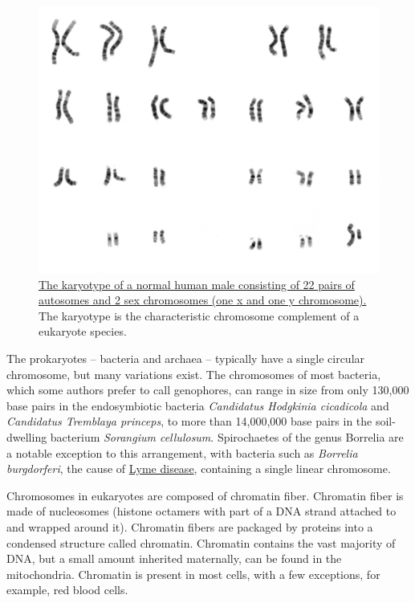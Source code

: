 \begin{figure}

{\centering \includegraphics[width=0.7\linewidth]{./figures/cellcycle/human_male_karyotype} 

}

\caption{\href{https://commons.wikimedia.org/wiki/File:NHGRI_human_male_karyotype.png}{The karyotype of a normal human male consisting of 22 pairs of autosomes and 2 sex chromosomes (one x and one y chromosome).} The karyotype is the characteristic chromosome complement of a eukaryote species.}\label{fig:karyotype}
\end{figure}

The prokaryotes -- bacteria and archaea -- typically have a single circular chromosome, but many variations exist. The chromosomes of most bacteria, which some authors prefer to call genophores, can range in size from only 130,000 base pairs in the endosymbiotic bacteria \emph{Candidatus Hodgkinia cicadicola} and \emph{Candidatus Tremblaya princeps}, to more than 14,000,000 base pairs in the soil-dwelling bacterium \emph{Sorangium cellulosum}. Spirochaetes of the genus Borrelia are a notable exception to this arrangement, with bacteria such as \emph{Borrelia burgdorferi}, the cause of \href{https://en.wikipedia.org/wiki/Lyme_disease}{Lyme disease}, containing a single linear chromosome.

Chromosomes in eukaryotes are composed of chromatin fiber. Chromatin fiber is made of nucleosomes (histone octamers with part of a DNA strand attached to and wrapped around it). Chromatin fibers are packaged by proteins into a condensed structure called chromatin. Chromatin contains the vast majority of DNA, but a small amount inherited maternally, can be found in the mitochondria. Chromatin is present in most cells, with a few exceptions, for example, red blood cells.

